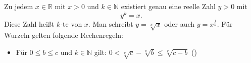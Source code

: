 Zu jedem $x \in \mathbb{R}$ mit $x > 0$ und $k \in \mathbb{N}$ existiert genau eine reelle Zahl $y > 0$ mit
$$y^k = x.$$
Diese Zahl heißt $k$-te  von $x$. Man schreibt $y = \sqrt[k]{x}$ oder auch $y = x^{\frac{1}{k}}$.
Für Wurzeln gelten folgende Rechenregeln:
\begin{itemize}
    \item Für $0 \leq b \leq c$ und $k \in \mathbb{N}$ gilt: $0 < \sqrt[k]{c} - \sqrt[k]{b} \leq \sqrt[k]{c-b}$ ()
\end{itemize}
